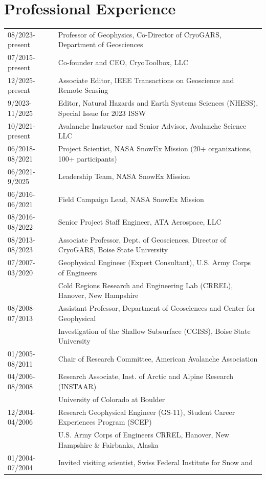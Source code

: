 \documentclass[11pt]{article}
\begin{document}
\section*{Professional Experience}
\begin{tabular}{ll}
08/2023-present & Professor of Geophysics, Co-Director of CryoGARS, Department of Geosciences \\
07/2015-present & Co-founder and CEO, CryoToolbox, LLC \\
12/2025-present & Associate Editor, IEEE Transactions on Geoscience and Remote Sensing \\
9/2023-11/2025 & Editor, Natural Hazards and Earth Systems Sciences (NHESS), Special Issue for 2023 ISSW \\
10/2021-present & Avalanche Instructor and Senior Advisor, Avalanche Science LLC \\
06/2018-08/2021 & Project Scientist, NASA SnowEx Mission (20+ organizations, 100+ participants) \\
06/2021-9/2025 & Leadership Team, NASA SnowEx Mission \\
06/2016-06/2021 & Field Campaign Lead, NASA SnowEx Mission \\
08/2016-08/2022 & Senior Project Staff Engineer, ATA Aerospace, LLC \\
08/2013-08/2023 & Associate Professor, Dept. of Geosciences, Director of CryoGARS, Boise State University \\
07/2007-03/2020 & Geophysical Engineer (Expert Consultant), U.S. Army Corps of Engineers \\
& Cold Regions Research and Engineering Lab (CRREL), Hanover, New Hampshire \\
08/2008-07/2013 & Assistant Professor, Department of Geosciences and Center for Geophysical \\
&   Investigation of the Shallow Subsurface (CGISS), Boise State University \\
01/2005-08/2011 & Chair of Research Committee, American Avalanche Association \\
04/2006-08/2008 & Research Associate, Inst. of Arctic and Alpine Research (INSTAAR) \\
& University of Colorado at Boulder \\ 
12/2004-04/2006 & Research Geophysical Engineer (GS-11), Student Career Experiences Program (SCEP) \\
& U.S. Army Corps of Engineers CRREL, Hanover, New Hampshire \& Fairbanks, Alaska \\
01/2004-07/2004 & Invited visiting scientist, Swiss Federal Institute for Snow and \\ 

\end{tabular}
\end{document}

